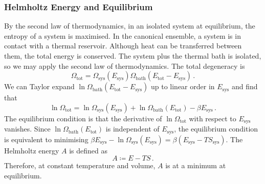 \documentclass{article}
\theoremstyle{plain}\theoremheaderfont{\normalfont\bfseries}\theorembodyfont{\rmfamily}\theoremseparator{.}\newtheorem*{thm}{Theorem}\newtheorem*{law}{Law}\newtheorem*{pos}{Postulate}
\numberwithin{equation}{section}
\newcommand{\sys}{\text{sys}}
\newcommand{\bath}{\text{bath}}
\newcommand{\tot}{\text{tot}}
\begin{document}
    \subsubsection{Helmholtz Energy and Equilibrium}
    By the second law of thermodynamics, in an isolated system at equilibrium, the entropy of a system is maximised. In the canonical ensemble, a system is in contact with a thermal reservoir. Although heat can be transferred between them, the total energy is conserved. The system plus the thermal bath is isolated, so we may apply the second law of thermodynamics. The total degeneracy is
    \begin{equation}
        \Omega_{\tot}=\Omega_{\sys}(E_{\sys})\Omega_{\bath}(E_{\tot}-E_{\sys})\,.
    \end{equation}
    We can Taylor expand \(\ln{\Omega_{\bath}(E_{\tot}-E_{\sys})}\) up to linear order in \(E_{\sys}\) and find that
    \begin{equation}
        \ln{\Omega_{\tot}}=\ln{\Omega_{\sys}(E_{\sys})}+\ln{\Omega_{\bath}(E_{\tot})}-\beta E_{\sys}\,.
    \end{equation}
    The equilibrium condition is that the derivative of \(\ln{\Omega_{\tot}}\) with respect to \(E_{\sys}\) vanishes. Since \(\ln\Omega_{\bath}(E_{\tot})\) is independent of \(E_{\sys}\), the equilibrium condition is equivalent to minimising \(\beta E_{\sys}-\ln{\Omega_{\sys}(E_{\sys})}=\beta(E_{\sys}-TS_{\sys})\). The Helmholtz energy \(A\) is defined as
    \begin{equation}
        A\coloneqq E-TS\,.
    \end{equation}
    Therefore, at constant temperature and volume, \(A\) is at a minimum at equilibrium.
\end{document}
